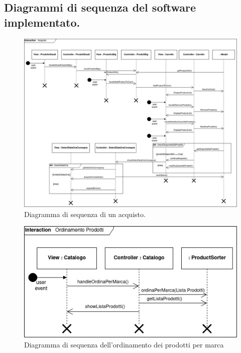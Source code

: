 \documentclass{article}
\begin{document}
\clearpage
\subsection{Diagrammi di sequenza del software implementato.}
\begin{figure}[h!]
	\centering
	\includegraphics[width=\textwidth]{SDAcquisto.jpg}
	\caption{Diagramma di sequenza di un acquisto.}
	\label{SDAcquisto.jpg}
	\newpage
\end{figure}

\begin{figure}[h!]
	\centering
	\includegraphics[width=\textwidth]{SDSorting.jpg}
	\caption{Diagramma di sequenza dell'ordinamento dei prodotti per marca}
	\label{fig:SDSorting}
\end{figure}

\clearpage
\end{document}

